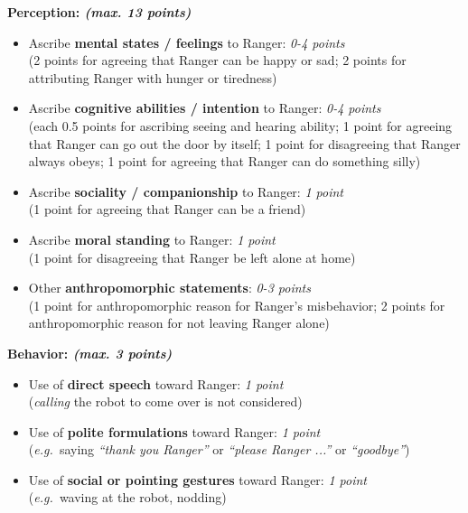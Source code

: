 \documentclass{sig-alternate}
\newcommand{\eg}{{\textit{e.g.~}}}
\begin{document}
\textbf{Perception: \textit{(max. 13 points)}}
\begin{itemize}
	\item Ascribe \textbf{mental states / feelings} to Ranger: \textit{0-4 points}\\
	(2 points for agreeing that Ranger can be happy or sad; 2 points for attributing Ranger with hunger or tiredness)
	\item Ascribe \textbf{cognitive abilities / intention} to Ranger: \textit{0-4 points}\\ 
	(each 0.5 points for ascribing seeing and hearing ability; 1 point for agreeing that Ranger can go out the door by itself; 1 point for disagreeing that Ranger always obeys; 1 point for agreeing that Ranger can do something silly)
	\item Ascribe \textbf{sociality / companionship} to Ranger: \textit{1 point}\\ 
	(1 point for agreeing that Ranger can be a friend)
	\item Ascribe \textbf{moral standing} to Ranger: \textit{1 point}\\ (1 point for disagreeing that Ranger be left alone at home)
	\item Other \textbf{anthropomorphic statements}: \textit{0-3 points}\\ 
	(1 point for anthropomorphic reason for Ranger's misbehavior; 2 points for anthropomorphic reason for not leaving Ranger alone) 
\end{itemize}

\textbf{Behavior: \textit{(max. 3 points)}}
\begin{itemize}
	\item Use of \textbf{direct speech} toward Ranger: \textit{1 point}\\
	(\textit{calling} the robot to come over is not considered)
	\item Use of \textbf{polite formulations} toward Ranger: \textit{1 point}\\ 
	(\eg saying \textit{``thank you Ranger''} or \textit{``please Ranger ...''} or \textit{``goodbye''})
	\item Use of \textbf{social or pointing gestures} toward Ranger: \textit{1 point}\\ 
	(\eg waving at the robot, nodding)
\end{itemize}
\end{document}
